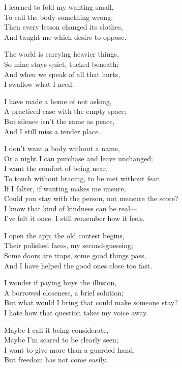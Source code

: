 \begin{lyrics}
I learned to fold my wanting small,\\
To call the body something wrong;\\
Then every lesson changed its clothes,\\
And taught me which desire to oppose.

The world is carrying heavier things,\\
So mine stays quiet, tucked beneath;\\
And when we speak of all that hurts,\\
I swallow what I need.

I have made a home of not asking,\\
A practiced ease with the empty space;\\
But silence isn't the same as peace,\\
And I still miss a tender place.

I don't want a body without a name,\\
Or a night I can purchase and leave unchanged;\\
I want the comfort of being near,\\
To touch without bracing, to be met without fear.\\
If I falter, if wanting makes me unsure,\\
Could you stay with the person, not measure the score?\\
I know that kind of kindness can be real—\\
I've felt it once. I still remember how it feels.

I open the app; the old contest begins,\\
Their polished faces, my second-guessing;\\
Some doors are traps, some good things pass,\\
And I have helped the good ones close too fast.

I wonder if paying buys the illusion,\\
A borrowed closeness, a brief solution;\\
But what would I bring that could make someone stay?\\
I hate how that question takes my voice away.

Maybe I call it being considerate,\\
Maybe I'm scared to be clearly seen;\\
I want to give more than a guarded hand,\\
But freedom has not come easily.


\end{lyrics}
